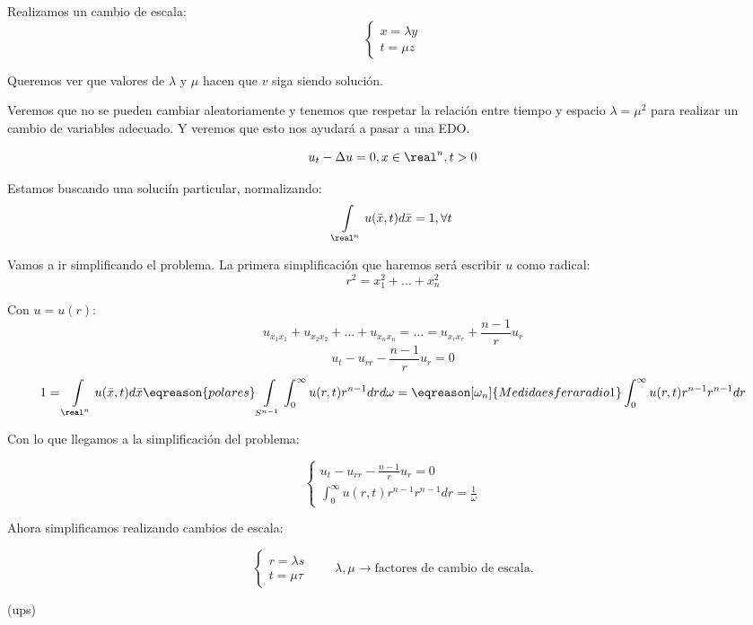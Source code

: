 		\begin{example}
			Realizamos un cambio de escala:
			\[\begin{cases}
				x = \lambda y\\
				t = \mu z
			\end{cases}\]

			Queremos ver que valores de $\lambda$ y $\mu$ hacen que $v$ siga siendo solución.

			Veremos que no se pueden cambiar aleatoriamente y tenemos que respetar la relación entre tiempo y espacio $\lambda = \mu^2$ para realizar un cambio de variables adecuado. Y veremos que esto nos ayudará a pasar a una EDO.
		\end{example}

		\begin{example}
			\[u_t - \Delta u = 0, x \in \real^n, t > 0\]
		\end{example}

		Estamos buscando una soluciín particular, normalizando:
		\[ \int\limits_{\real^n} u(\bar{x},t) d\bar{x} = 1, \forall t\]


		Vamos a ir simplificando el problema. La primera simplificación que haremos será escribir $u$ como radical:
		\[ r^2 = x^2_1 + … + x^2_n \]

		Con $u = u(r)$:
		\[ u_{x_1 x_1} + u_{x_2 x_2} + … + u_{x_n x_n} = … = u_{x_r x_r} + \frac{n-1}{r}u_r \]
		\[ u_t - u_{rr} - \frac{n-1}{r}u_r  = 0\]
		\[ 1 = \int\limits_{\real^n}  u(\bar{x},t) d \bar{x} \eqreason{polares} \int\limits_{S^{n-1}} \int_0^\infty u(r,t) r^{n-1} dr d\omega = \eqreason[\omega_n]{Medida esfera radio 1} \int_0^\infty u(r,t) r^{n-1} r^{n-1} dr \]

		Con lo que llegamos a la simplificación del problema:

		\[\begin{cases}
			u_t - u_{rr} - \frac{n-1}{r}u_r  = 0\\
			\int_0^\infty u(r,t) r^{n-1} r^{n-1} dr = \frac{1}{\omega}
		\end{cases}\]

		Ahora simplificamos realizando cambios de escala:

		\[\begin{cases}
			r = \lambda s\\
			t = \mu \tau
		\end{cases} \quad\quad \lambda, \mu \rightarrow \text{factores de cambio de escala.}\]

		(ups)


